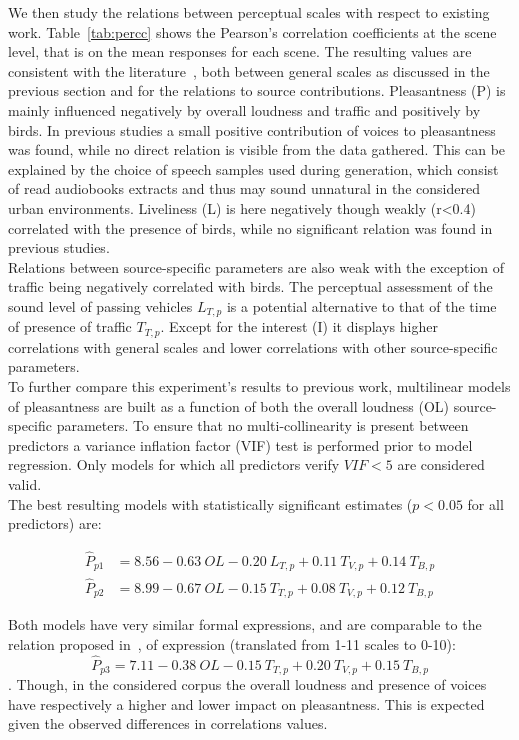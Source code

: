 \documentclass[11pt,a4paper]{article}
\begin{document}
We then study the relations between perceptual scales with respect to existing work. Table~\ref{tab:percc} shows the Pearson's correlation coefficients at the scene level, that is on the mean responses for each scene. The resulting values are consistent with the literature~\cite{aumond2017, gontier2018}, both between general scales as discussed in the previous section and for the relations to source contributions. Pleasantness (P) is mainly influenced negatively by overall loudness and traffic and positively by birds. In previous studies a small positive contribution of voices to pleasantness was found, while no direct relation is visible from the data gathered. This can be explained by the choice of speech samples used during generation, which consist of read audiobooks extracts and thus may sound unnatural in the considered urban environments. Liveliness (L) is here negatively though weakly (r<0.4) correlated with the presence of birds, while no significant relation was found in previous studies.\\

Relations between source-specific parameters are also weak with the exception of traffic being negatively correlated with birds. The perceptual assessment of the sound level of passing vehicles $L_{T, p}$ is a potential alternative to that of the time of presence of traffic $T_{T, p}$. Except for the interest (I) it displays higher correlations with general scales and lower correlations with other source-specific parameters.\\

To further compare this experiment's results to previous work, multilinear models of pleasantness are built as a function of both the overall loudness (OL) source-specific parameters. To ensure that no multi-collinearity is present between predictors a variance inflation factor (VIF) test is performed prior to model regression. Only models for which all predictors verify $VIF<5$ are considered valid.\\

The best resulting models with statistically significant estimates ($p<0.05$ for all predictors) are:

\begin{align}
\hat P_{p1} &= 8.56 - 0.63~OL - 0.20~L_{T, p} + 0.11~T_{V, p} + 0.14~T_{B, p}\\
\hat P_{p2} &= 8.99 - 0.67~OL - 0.15~T_{T, p} + 0.08~T_{V, p} + 0.12~T_{B, p}
\end{align}

Both models have very similar formal expressions, and are comparable to the relation proposed in~\cite{ricciardi2014}, of expression (translated from 1-11 scales to 0-10):
\begin{equation}
\hat P_{p3} = 7.11 - 0.38~OL - 0.15~T_{T, p} + 0.20~T_{V, p} + 0.15~T_{B, p}
\end{equation}.
Though, in the considered corpus the overall loudness and presence of voices have respectively a higher and lower impact on pleasantness. This is expected given the observed differences in correlations values.\\
\end{document}
